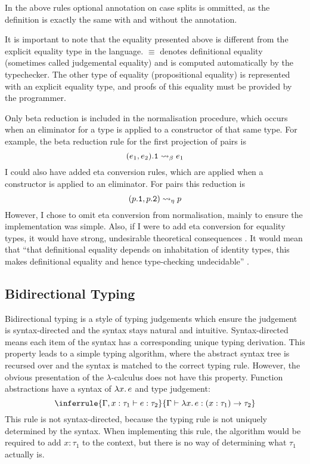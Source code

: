 \documentclass[12pt,a4paper,twoside]{report}
\begin{document}
In the above rules optional annotation on case splits is ommitted, as the definition is exactly the same with and without the annotation.

It is important to note that the equality presented above is different from the explicit equality type in the language.
\(\equiv\) denotes definitional equality (sometimes called judgemental equality) and is computed automatically by the typechecker.
The other type of equality (propositional equality) is represented with an explicit equality type, and proofs of this equality must be provided by the programmer.

Only beta reduction is included in the normalisation procedure, which occurs when an eliminator for a type is applied to a constructor of that same type.
For example, the beta reduction rule for the first projection of pairs is
\[
    (e_1, e_2)\mathtt{.1} \rightsquigarrow_\beta e_1
\]
I could also have added eta conversion rules, which are applied when a constructor is applied to an eliminator.
For pairs this reduction is
\[
    (p\mathtt{.1}, p\mathtt{.2}) \rightsquigarrow_\eta p
\]
However, I chose to omit eta conversion from normalisation, mainly to ensure the implementation was simple.
Also, if I were to add eta conversion for equality types, it would have strong, undesirable theoretical consequences \cite{streicher93}.
It would mean that ``that definitional equality depends on inhabitation of identity types, this makes definitional equality and hence type-checking undecidable'' \cite{nlabid}.

\subsection{Bidirectional Typing}

Bidirectional typing \cite{pierce98} is a style of typing judgements which ensure the judgement is syntax-directed and the syntax stays natural and intuitive.
Syntax-directed means each item of the syntax has a corresponding unique typing derivation.
This property leads to a simple typing algorithm, where the abstract syntax tree is recursed over and the syntax is matched to the correct typing rule.
However, the obvious presentation of the \(\lambda\)-calculus does not have this property.
Function abstractions have a syntax of \(\lambda x \ldotp e\) and type judgement:
\[
    \inferrule{\typing{\Gamma, x: \tau_1}{e}{\tau_2}} {\typing{\Gamma}{\fun{x}{}{e}}{\pi{x}{\tau_1}{\tau_2}}}
\]
This rule is not syntax-directed, because the typing rule is not uniquely determined by the syntax.
When implementing this rule, the algorithm would be required to add \(x : \tau_1\) to the context, but there is no way of determining what \(\tau_1\) actually is.
\end{document}
